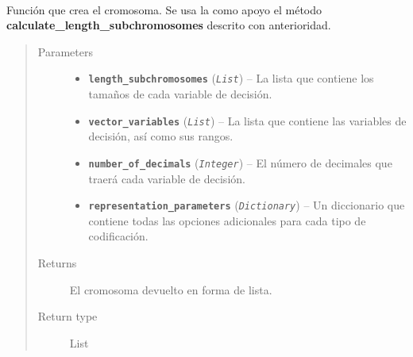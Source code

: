\documentclass[class=report, crop=false]{standalone}
\begin{document}
\begin{fulllineitems}
~
\vspace{-0.1cm}

Función que crea el cromosoma. Se usa la como apoyo el método \break
\textbf{calculate\_length\_subchromosomes} descrito con anterioridad.

\begin{quote}\begin{description}
\item[{Parameters}] \leavevmode\begin{itemize}
\item \textbf{\texttt{length\_subchromosomes}} (\emph{\texttt{List}}) -- La lista que contiene los tamaños de cada variable de decisión.
\item \textbf{\texttt{vector\_variables}} (\emph{\texttt{List}}) -- La lista que contiene las variables de decisión, así como sus rangos.
\item \textbf{\texttt{number\_of\_decimals}} (\emph{\texttt{Integer}}) -- El número de decimales que traerá cada variable de decisión.
\item \textbf{\texttt{representation\_parameters}} (\emph{\texttt{Dictionary}}) -- Un diccionario que contiene todas las opciones adicionales para cada tipo de codificación.
\end{itemize}

\item[{Returns}] \leavevmode
El cromosoma devuelto en forma de lista.
\item[{Return type}] \leavevmode
List
\end{description}\end{quote}

\end{fulllineitems}
\end{document}
